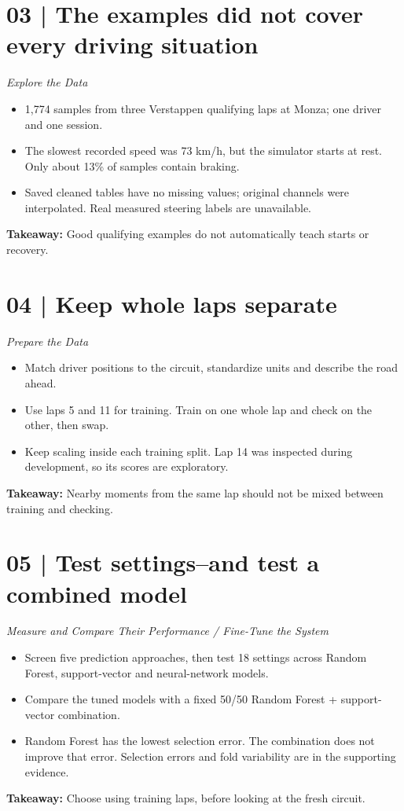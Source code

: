 \documentclass[10pt,a4paper]{article}
\newcommand{\takeaway}[1]{\begin{tcolorbox}[colback=paperblue,colframe=paperblue,boxrule=0pt]#1\end{tcolorbox}}
\begin{document}
\section*{03 | The examples did not cover every driving situation}
{\small\textit{Explore the Data}}
\begin{itemize}
\item 1,774 samples from three Verstappen qualifying laps at Monza; one driver and one session.
\item The slowest recorded speed was 73 km/h, but the simulator starts at rest. Only about 13\% of samples contain braking.
\item Saved cleaned tables have no missing values; original channels were interpolated. Real measured steering labels are unavailable.
\end{itemize}
\takeaway{\textbf{Takeaway:} Good qualifying examples do not automatically teach starts or recovery.}
\section*{04 | Keep whole laps separate}
{\small\textit{Prepare the Data}}
\begin{itemize}
\item Match driver positions to the circuit, standardize units and describe the road ahead.
\item Use laps 5 and 11 for training. Train on one whole lap and check on the other, then swap.
\item Keep scaling inside each training split. Lap 14 was inspected during development, so its scores are exploratory.
\end{itemize}
\takeaway{\textbf{Takeaway:} Nearby moments from the same lap should not be mixed between training and checking.}
\clearpage
\section*{05 | Test settings--and test a combined model}
{\small\textit{Measure and Compare Their Performance / Fine-Tune the System}}
\begin{itemize}
\item Screen five prediction approaches, then test 18 settings across Random Forest, support-vector and neural-network models.
\item Compare the tuned models with a fixed 50/50 Random Forest + support-vector combination.
\item Random Forest has the lowest selection error. The combination does not improve that error. Selection errors and fold variability are in the supporting evidence.
\end{itemize}
\takeaway{\textbf{Takeaway:} Choose using training laps, before looking at the fresh circuit.}
\end{document}
